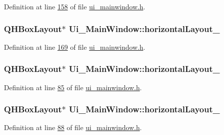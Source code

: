 Definition at line \hyperlink{a00139_source_l00158}{158} of file \hyperlink{a00139_source}{ui\+\_\+mainwindow.\+h}.

\hypertarget{a00080_a03ce63974cc69b067c91bbf285cceca8}{
\subsubsection[{horizontal\+Layout\+\_\+3}]{\setlength{\rightskip}{0pt plus 5cm}Q\+H\+Box\+Layout$\ast$ Ui\+\_\+\+Main\+Window\+::horizontal\+Layout\+\_}}\label{a00080_a03ce63974cc69b067c91bbf285cceca8}


Definition at line \hyperlink{a00139_source_l00169}{169} of file \hyperlink{a00139_source}{ui\+\_\+mainwindow.\+h}.

\hypertarget{a00080_ae183387a7d233b437a637b403ba39ffd}{
\subsubsection[{horizontal\+Layout\+\_\+4}]{\setlength{\rightskip}{0pt plus 5cm}Q\+H\+Box\+Layout$\ast$ Ui\+\_\+\+Main\+Window\+::horizontal\+Layout\+\_}}\label{a00080_ae183387a7d233b437a637b403ba39ffd}


Definition at line \hyperlink{a00139_source_l00085}{85} of file \hyperlink{a00139_source}{ui\+\_\+mainwindow.\+h}.

\hypertarget{a00080_a14c9d4842c3e97e16e7873ef0aecdb1e}{
\subsubsection[{horizontal\+Layout\+\_\+5}]{\setlength{\rightskip}{0pt plus 5cm}Q\+H\+Box\+Layout$\ast$ Ui\+\_\+\+Main\+Window\+::horizontal\+Layout\+\_}}\label{a00080_a14c9d4842c3e97e16e7873ef0aecdb1e}


Definition at line \hyperlink{a00139_source_l00088}{88} of file \hyperlink{a00139_source}{ui\+\_\+mainwindow.\+h}.

